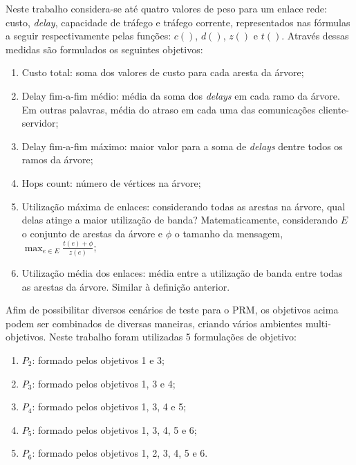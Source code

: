 Neste trabalho considera-se até quatro valores de peso para um enlace rede: custo, \textit{delay}, capacidade de tráfego e tráfego corrente, representados nas fórmulas a seguir respectivamente pelas funções: $c()$, $d()$, $z()$ e $t()$. Através dessas medidas são formulados os seguintes objetivos:

\begin{enumerate} 
	\item Custo total: soma dos valores de custo para cada aresta da árvore;
	\item Delay fim-a-fim médio: média da soma dos \textit{delays} em cada ramo da árvore. Em outras palavras, média do atraso em cada uma das comunicações cliente-servidor;
	\item Delay fim-a-fim máximo: maior valor para a soma de \textit{delays} dentre todos os ramos da árvore;
	\item Hops count: número de vértices na árvore;
	\item Utilização máxima de enlaces: considerando todas as arestas na árvore, qual delas atinge a maior utilização de banda? Matematicamente, considerando $E$ o conjunto de arestas da árvore e $\phi$ o tamanho da mensagem, $\max_{e \in E} \frac{t(e) + \phi}{z(e)}$;
	\item Utilização média dos enlaces: média entre a utilização de banda entre todas as arestas da árvore. Similar à definição anterior.
\end{enumerate}

Afim de possibilitar diversos cenários de teste para o PRM, os objetivos acima podem ser combinados de diversas maneiras, criando vários ambientes multi-objetivos. Neste trabalho foram utilizadas 5 formulações de objetivo:

\begin{enumerate}
	\item $P_2$: formado pelos objetivos 1 e 3;
	\item $P_3$: formado pelos objetivos 1, 3 e 4;
	\item $P_4$: formado pelos objetivos 1, 3, 4 e 5;
	\item $P_5$: formado pelos objetivos 1, 3, 4, 5 e 6;
	\item $P_6$: formado pelos objetivos 1, 2, 3, 4, 5 e 6.
\end{enumerate}
